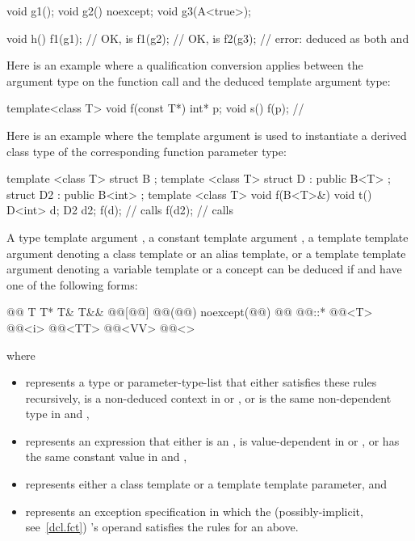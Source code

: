 \begin{example}
\begin{codeblock}
void g1();
void g2() noexcept;
void g3(A<true>);

void h() {
  f1(g1);           // OK,  is 
  f1(g2);           // OK,  is 
  f2(g3);           // error:  deduced as both  and 
}
\end{codeblock}

Here is an example where a qualification conversion applies between the
argument type on the function call and the deduced template argument type:

\begin{codeblock}
template<class T> void f(const T*) { }
int* p;
void s() {
  f(p);             // 
}
\end{codeblock}

Here is an example where the template argument is used to instantiate
a derived class type of the corresponding function parameter type:

\begin{codeblock}
template <class T> struct B { };
template <class T> struct D : public B<T> {};
struct D2 : public B<int> {};
template <class T> void f(B<T>&) {}
void t() {
  D<int> d;
  D2     d2;
  f(d);             // calls 
  f(d2);            // calls 
}
\end{codeblock}
\end{example}

\pnum
A type template argument ,
a constant template argument ,
a template template argument 
denoting a class template or an alias template, or
a template template argument 
denoting a variable template or a concept
can be deduced if
and
have one of the following forms:
\begin{codeblock}
@\opt{\cv{}}@ T
T*
T&
T&&
@@[@@]
@@(@@) noexcept(@@)
@@ @@::*
@@<T>
@@<i>
@@<TT>
@@<VV>
@@<>
\end{codeblock}
where
\begin{itemize}
\item
{} represents a type or parameter-type-list that either
satisfies these rules recursively,
is a non-deduced context in  or , or
is the same non-dependent type in  and ,

\item
{} represents an expression that either
is an ,
is value-dependent in  or , or
has the same constant value in  and ,

\item
{} represents either a class template or
a template template parameter, and

\item
{} represents an
exception specification
in which the (possibly-implicit, see~\ref{dcl.fct})
's operand
satisfies the rules for an  above.
\end{itemize}


